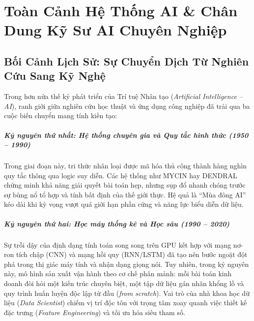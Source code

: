 
\chapter{Toàn Cảnh Hệ Thống AI \& Chân Dung Kỹ Sư AI Chuyên Nghiệp}
\label{ch:orientation-ai-engineer}

\section{Bối Cảnh Lịch Sử: Sự Chuyển Dịch Từ Nghiên Cứu Sang Kỹ Nghệ}
\label{sec:history-and-shift}

Trong hơn nửa thế kỷ phát triển của Trí tuệ Nhân tạo (\textit{Artificial Intelligence -- AI}), ranh giới giữa nghiên cứu học thuật và ứng dụng công nghiệp đã trải qua ba cuộc biến chuyển mang tính kiến tạo:

\paragraph{Kỷ nguyên thứ nhất: Hệ thống chuyên gia và Quy tắc hình thức (1950 -- 1990)}
Trong giai đoạn này, tri thức nhân loại được mã hóa thủ công thành hàng nghìn quy tắc  thông qua logic suy diễn. Các hệ thống như MYCIN hay DENDRAL chứng minh khả năng giải quyết bài toán hẹp, nhưng sụp đổ nhanh chóng trước sự bùng nổ tổ hợp và tính bất định của thế giới thực. Hệ quả là ``Mùa đông AI'' kéo dài khi kỳ vọng vượt quá giới hạn phần cứng và năng lực biểu diễn dữ liệu.

\paragraph{Kỷ nguyên thứ hai: Học máy thống kê và Học sâu (1990 -- 2020)}
Sự trỗi dậy của định dạng tính toán song song trên GPU kết hợp với mạng nơ-ron tích chập (CNN) và mạng hồi quy (RNN/LSTM) đã tạo nên bước ngoặt đột phá trong thị giác máy tính và nhận dạng giọng nói. Tuy nhiên, trong kỷ nguyên này, mô hình sản xuất vận hành theo cơ chế phân mảnh: mỗi bài toán kinh doanh đòi hỏi một kiến trúc chuyên biệt, một tập dữ liệu gán nhãn khổng lồ và quy trình huấn luyện độc lập từ đầu (\textit{from scratch}). Vai trò của nhà khoa học dữ liệu (\textit{Data Scientist}) chiếm vị trí độc tôn với trọng tâm xoay quanh việc thiết kế đặc trưng (\textit{Feature Engineering}) và tối ưu hóa siêu tham số.

